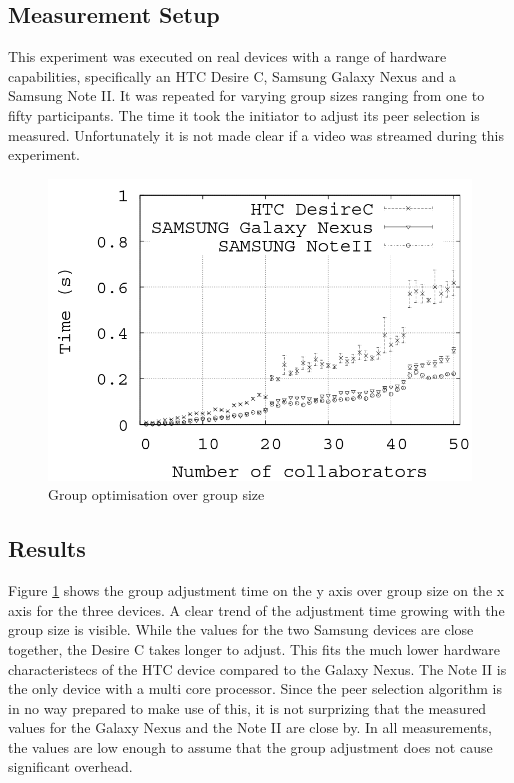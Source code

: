\subsection{Measurement Setup}
This experiment was executed on real devices with a range of hardware capabilities, specifically an HTC Desire C, Samsung Galaxy Nexus and a Samsung Note II. It was repeated for varying group sizes ranging from one to fifty participants. The time it took the initiator to adjust its peer selection is measured. Unfortunately it is not made clear if a video was streamed during this experiment.
\begin{figure}[hbt]
\centering
\caption{Group optimisation over group size \cite{ColStream}}
\label{groupAdjustment}
\includegraphics[scale=.5]{figures/ColStreamAdjustment.png}
\end{figure}
\subsection{Results}
Figure \ref{groupAdjustment} shows the group adjustment time on the y axis over group size on the x axis for the three devices. A clear trend of the adjustment time growing with the group size is visible. While the values for the two Samsung devices are close together, the Desire C takes longer to adjust.
This fits the much lower hardware characteristecs of the HTC device compared to the Galaxy Nexus. The Note II is the only device with a multi core processor. Since the peer selection algorithm is in no way prepared to make use of this, it is not surprizing that the measured values for the Galaxy Nexus and the Note II are close by. In all measurements, the values are low enough to assume that the group adjustment does not cause significant overhead.

